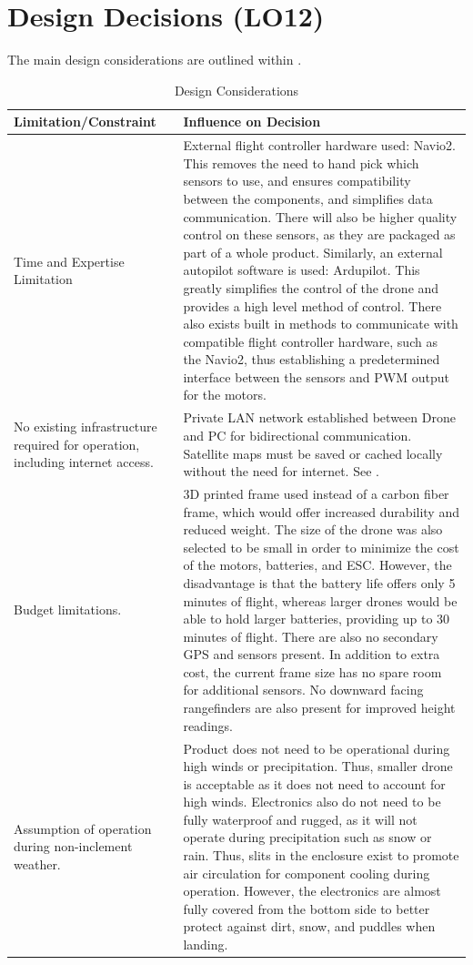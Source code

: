 \documentclass{article}
\begin{document}
\section{Design Decisions (LO12)}

The main design considerations are outlined within .

\begin{table}[!h]
\begin{center}
\caption {Design Considerations}
\label{tab:designConsiderations}
\begin{tabular}{ | m{4.7cm} | m{10.7cm} | } 
\hline
Limitation/Constraint & Influence on Decision \\ 
\hline
Time and Expertise Limitation &
    External flight controller hardware used: Navio2. This removes the need to hand pick which sensors to use, and ensures compatibility between the components, and simplifies data communication. There will also be higher quality control on these sensors, as they are packaged as part of a whole product. 
    Similarly, an external autopilot software is used: Ardupilot. This greatly simplifies the control of the drone and provides a high level method of control. There also exists built in methods to communicate with compatible flight controller hardware, such as the Navio2, thus establishing a predetermined interface between the sensors and PWM output for the motors.    \\
\hline
No existing infrastructure required for operation, including internet access. &
    Private LAN network established between Drone and PC for bidirectional communication. Satellite maps must be saved or cached locally without the need for internet. See \nameref{subsec:GUI}.   \\
\hline
Budget limitations. &
    3D printed frame used instead of a carbon fiber frame, which would offer increased durability and reduced weight. The size of the drone was also selected to be small in order to minimize the cost of the motors, batteries, and ESC. However, the disadvantage is that the battery life offers only 5 minutes of flight, whereas larger drones would be able to hold larger batteries, providing up to 30 minutes of flight. There are also no secondary GPS and sensors present. In addition to extra cost, the current frame size has no spare room for additional sensors. No downward facing rangefinders are also present for improved height readings.  \\
\hline
Assumption of operation during non-inclement weather. &
    Product does not need to be operational during high winds or precipitation. Thus, smaller drone is acceptable as it does not need to account for high winds. Electronics also do not need to be fully waterproof and rugged, as it will not operate during precipitation such as snow or rain. Thus, slits in the enclosure exist to promote air circulation for component cooling during operation. However, the  electronics are almost fully covered from the bottom side to better protect against dirt, snow, and puddles when landing.    \\

\end{tabular}
\end{center}
\end{table}
\end{document}
